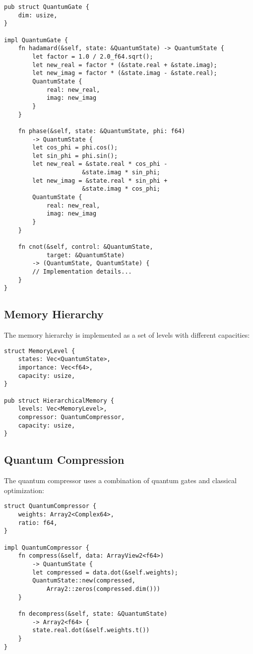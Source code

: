 \documentclass[10pt]{article}
\begin{document}
\begin{verbatim}
pub struct QuantumGate {
    dim: usize,
}

impl QuantumGate {
    fn hadamard(&self, state: &QuantumState) -> QuantumState {
        let factor = 1.0 / 2.0_f64.sqrt();
        let new_real = factor * (&state.real + &state.imag);
        let new_imag = factor * (&state.imag - &state.real);
        QuantumState { 
            real: new_real, 
            imag: new_imag 
        }
    }

    fn phase(&self, state: &QuantumState, phi: f64) 
        -> QuantumState {
        let cos_phi = phi.cos();
        let sin_phi = phi.sin();
        let new_real = &state.real * cos_phi - 
                      &state.imag * sin_phi;
        let new_imag = &state.real * sin_phi + 
                      &state.imag * cos_phi;
        QuantumState { 
            real: new_real, 
            imag: new_imag 
        }
    }

    fn cnot(&self, control: &QuantumState, 
            target: &QuantumState) 
        -> (QuantumState, QuantumState) {
        // Implementation details...
    }
}
\end{verbatim}

\subsection{Memory Hierarchy}

The memory hierarchy is implemented as a set of levels with different capacities:

\begin{verbatim}
struct MemoryLevel {
    states: Vec<QuantumState>,
    importance: Vec<f64>,
    capacity: usize,
}

pub struct HierarchicalMemory {
    levels: Vec<MemoryLevel>,
    compressor: QuantumCompressor,
    capacity: usize,
}
\end{verbatim}

\subsection{Quantum Compression}

The quantum compressor uses a combination of quantum gates and classical optimization:

\begin{verbatim}
struct QuantumCompressor {
    weights: Array2<Complex64>,
    ratio: f64,
}

impl QuantumCompressor {
    fn compress(&self, data: ArrayView2<f64>) 
        -> QuantumState {
        let compressed = data.dot(&self.weights);
        QuantumState::new(compressed, 
            Array2::zeros(compressed.dim()))
    }

    fn decompress(&self, state: &QuantumState) 
        -> Array2<f64> {
        state.real.dot(&self.weights.t())
    }
}
\end{verbatim}
\end{document}
